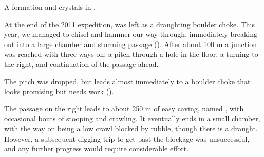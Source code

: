 \begin{marginfigure}
\checkoddpage \ifoddpage \forcerectofloat \else \forceversofloat \fi
\centering
 \caption{A formation and crystals in . }
 \label{bnw crystals}
\end{marginfigure}

At the end of the 2011 expedition,  was left as a
draughting boulder choke. This year, we managed to chisel and hammer our
way through, immediately breaking out into a large chamber and storming
passage (). After about 100 m a junction was reached with
three ways on: a pitch through a hole in the floor, a turning to the right, and continuation of the passage ahead.

The pitch was dropped, but leads almost immediately to a boulder choke
that looks promising but needs work ().

The passage on the right leads to about 250 m of easy caving, named ,
with occasional bouts of stooping and crawling. It eventually ends in a
small chamber, with the way on being a low crawl blocked by rubble,
though there is a draught. However, a subsequent digging trip to get
past the blockage was unsuccessful, and any further progress would
require considerable effort.

